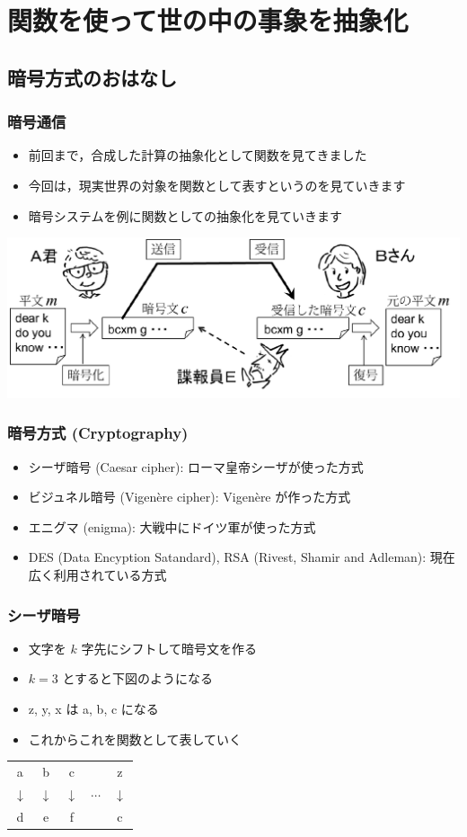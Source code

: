 \section{関数を使って世の中の事象を抽象化}
\subsection{暗号方式のおはなし}
\begin{frame}[fragile]
\frametitle{暗号通信}
  \begin{itemize}
\item 前回まで，合成した計算の抽象化として関数を見てきました
\item 今回は，現実世界の対象を関数として表すというのを見ていきます
\item 暗号システムを例に関数としての抽象化を見ていきます
  \end{itemize}
  \begin{center}
\includegraphics[scale=0.3]{./Figure/elementaryCS-figAliceBob.pdf}
  \end{center}
\end{frame}
\begin{frame}[fragile]
\frametitle{暗号方式 (Cryptography)}
  \begin{itemize}
\item シーザ暗号 (Caesar cipher): ローマ皇帝シーザが使った方式
\item ビジュネル暗号 (Vigen\`{e}re cipher): Vigen\`{e}re が作った方式
\item エニグマ (enigma): 大戦中にドイツ軍が使った方式
\item DES (Data Encyption Satandard), RSA (Rivest, Shamir and Adleman): 現在広く利用されている方式
  \end{itemize}
\end{frame}
\begin{frame}[fragile]
\frametitle{シーザ暗号}
  \begin{itemize}
\item 文字を $k$ 字先にシフトして暗号文を作る
\item \(k=3\) とすると下図のようになる
\item z, y, x は a, b, c になる
\item これからこれを関数として表していく
  \end{itemize}
  \begin{center}
    \begin{tabular}{ccccc}
a & b & c && z\\
$\downarrow$&$\downarrow$&$\downarrow$&$\cdots$&$\downarrow$\\
d & e & f && c
    \end{tabular}
  \end{center}
\end{frame}
